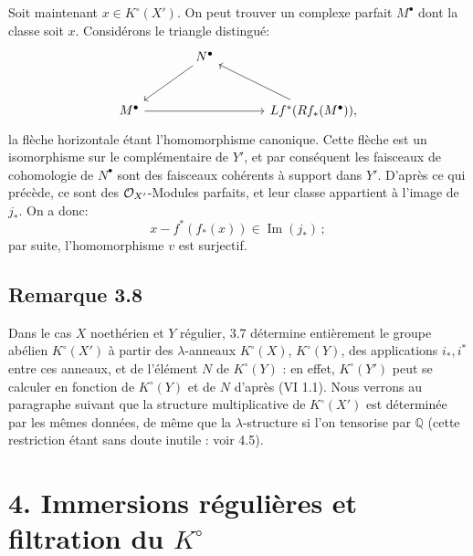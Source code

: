 Soit maintenant \(x\in K^\circ(X')\). On peut trouver un complexe parfait \(M^\bullet\) dont la classe soit \(x\). Considérons le triangle distingué:
\[
\begin{tikzcd}[column sep=large,row sep=large]
& N^\bullet \arrow[dl] &\\
M^\bullet \arrow[rr] && Lf^*(Rf_*(M^\bullet)) \arrow[ul] ,
\end{tikzcd}
\]
la flèche horizontale étant l'homomorphisme canonique. Cette flèche est un isomorphisme sur le complémentaire de \(Y'\), et par conséquent les faisceaux de cohomologie de \(N^\bullet\) sont des faisceaux cohérents à support dans \(Y'\). D'après ce qui précède, ce sont des \(\cO_{X'}\)-Modules parfaits, et leur classe appartient à l'image de \(j_*\). On a donc:
\[
x-f^*(f_*(x))\in\operatorname{Im}(j_*)\,;
\]
par suite, l'homomorphisme \(v\) est surjectif.



\providecommand{\Q}{\mathbb Q}
\providecommand{\bfP}{\mathbf P}
\providecommand{\gr}{\operatorname{gr}}
\providecommand{\Id}{\operatorname{Id}}
\providecommand{\Fil}{\operatorname{Fil}}
\providecommand{\Imf}{\operatorname{Im}}
\providecommand{\rank}{\operatorname{rank}}
\providecommand{\codim}{\operatorname{codim}}
\providecommand{\cJ}{\mathcal J}
\providecommand{\cI}{\mathcal I}
\providecommand{\cN}{\mathcal N}
\providecommand{\cE}{\mathcal E}
\providecommand{\cO}{\mathcal O}


\subsection*{Remarque 3.8}

Dans le cas \(X\) noethérien et \(Y\) régulier, 3.7 détermine entièrement le groupe abélien \(K^\circ(X')\) à partir des \(\lambda\)-anneaux \(K^\circ(X)\), \(K^\circ(Y)\), des applications \(i_*,i^*\) entre ces anneaux, et de l'élément \(N\) de \(K^\circ(Y)\) : en effet, \(K^\circ(Y')\) peut se calculer en fonction de \(K^\circ(Y)\) et de \(N\) d'après (VI 1.1). Nous verrons au paragraphe suivant que la structure multiplicative de \(K^\circ(X')\) est déterminée par les mêmes données, de même que la \(\lambda\)-structure si l'on tensorise par \(\mathbb Q\) (cette restriction étant sans doute inutile : voir 4.5).

\section*{4. Immersions régulières et filtration du \(K^\circ\)}

